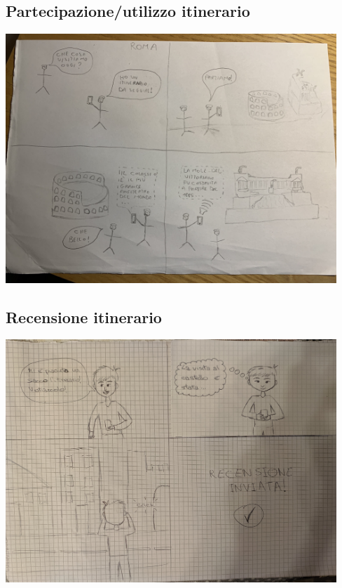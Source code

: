 \centering \subsection{Partecipazione/utilizzo itinerario}

\begin{center}
    \includegraphics[width=12.5cm]{../storyboards/Utilizzo.jpg}
\end{center}

\centering \subsection{Recensione itinerario}

\begin{center}
    \includegraphics[width=12.5cm]{../storyboards/Recensione.jpg}
\end{center}